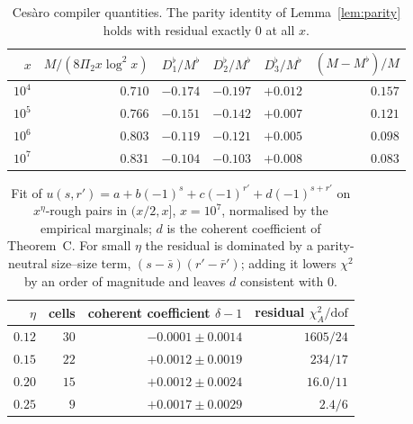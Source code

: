 \documentclass[11pt]{amsart}
\theoremstyle{definition}
\theoremstyle{remark}
\begin{document}
\begin{table}[h]
\centering
\begin{tabular}{rrrrrr}
\toprule
$x$ & $M/(8\Pi_2x\log^2x)$ & $D_1^\flat/M^\flat$ & $D_2^\flat/M^\flat$ & $D_3^\flat/M^\flat$ & $(M-M^\flat)/M$\\
\midrule
$10^4$ & $0.710$ & $-0.174$ & $-0.197$ & $+0.012$ & $0.157$\\
$10^5$ & $0.766$ & $-0.151$ & $-0.142$ & $+0.007$ & $0.121$\\
$10^6$ & $0.803$ & $-0.119$ & $-0.121$ & $+0.005$ & $0.098$\\
$10^7$ & $0.831$ & $-0.104$ & $-0.103$ & $+0.008$ & $0.083$\\
\bottomrule
\end{tabular}
\caption{Cesàro compiler quantities. The parity identity of Lemma~\ref{lem:parity} holds with residual exactly $0$ at all $x$.}
\end{table}

\begin{table}[h]
\centering
\begin{tabular}{rrrr}
\toprule
$\eta$ & cells & coherent coefficient $\delta-1$ & residual $\chi^2_A/\mathrm{dof}$\\
\midrule
$0.12$ & $30$ & $-0.0001\pm0.0014$ & $1605/24$\\
$0.15$ & $22$ & $+0.0012\pm0.0019$ & $234/17$\\
$0.20$ & $15$ & $+0.0012\pm0.0024$ & $16.0/11$\\
$0.25$ & $9$ & $+0.0017\pm0.0029$ & $2.4/6$\\
\bottomrule
\end{tabular}
\caption{Fit of $u(s,r')=a+b(-1)^s+c(-1)^{r'}+d(-1)^{s+r'}$ on $x^\eta$-rough pairs in $(x/2,x]$, $x=10^7$, normalised by the empirical marginals; $d$ is the coherent coefficient of Theorem~C. For small $\eta$ the residual is dominated by a parity-neutral size--size term, $(s-\bar s)(r'-\bar r')$; adding it lowers $\chi^2$ by an order of magnitude and leaves $d$ consistent with $0$.}
\end{table}
\end{document}
